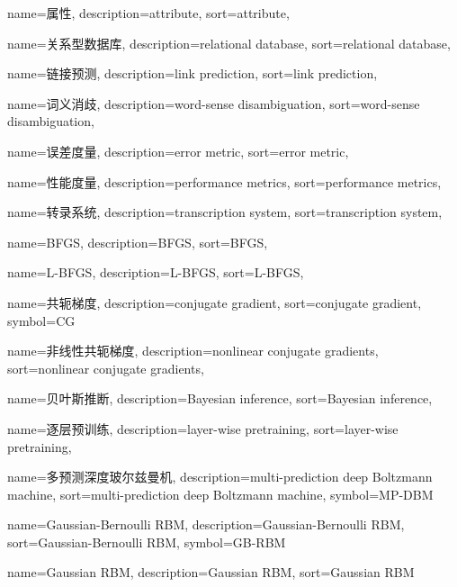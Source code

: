 {
  name=属性,
  description={attribute},
  sort={attribute},
}

{
  name=关系型数据库,
  description={relational database},
  sort={relational database},
}

{
  name=链接预测,
  description={link prediction},
  sort={link prediction},
}

{
  name=词义消歧,
  description={word-sense disambiguation},
  sort={word-sense disambiguation},
}

{
  name=误差度量,
  description={error metric},
  sort={error metric},
}

{
  name=性能度量,
  description={performance metrics},
  sort={performance metrics},
}

{
  name=转录系统,
  description={transcription system},
  sort={transcription system},
}

{
  name=BFGS,
  description={BFGS},
  sort={BFGS},
}

{
  name=L-BFGS,
  description={L-BFGS},
  sort={L-BFGS},
}

{
  name=共轭梯度,
  description={conjugate gradient},
  sort={conjugate gradient},
  symbol={CG}
}

{
  name=非线性共轭梯度,
  description={nonlinear conjugate gradients},
  sort={nonlinear conjugate gradients},
}

{
  name=贝叶斯推断,
  description={Bayesian inference},
  sort={Bayesian inference},
}

{
  name=逐层预训练,
  description={layer-wise pretraining},
  sort={layer-wise pretraining},
}

{
  name=多预测深度玻尔兹曼机,
  description={multi-prediction deep Boltzmann machine},
  sort={multi-prediction deep Boltzmann machine},
  symbol={MP-DBM}
}

{
  name=Gaussian-Bernoulli RBM,
  description={Gaussian-Bernoulli RBM},
  sort={Gaussian-Bernoulli RBM},
  symbol={GB-RBM}
}

{
  name=Gaussian RBM,
  description={Gaussian RBM},
  sort={Gaussian RBM}
}


